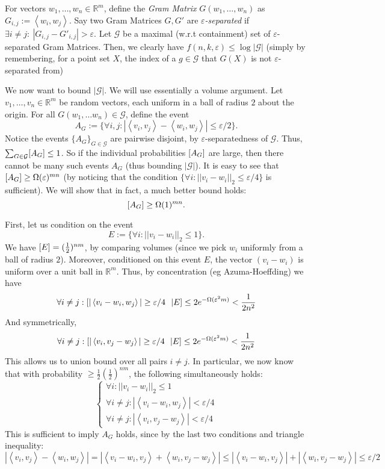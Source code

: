 \documentclass[11pt]{article}
\let\Pr\relax
\DeclareMathOperator*{\Pr}{\mathbb{P}}
\newcommand{\eps}{\varepsilon}
\newcommand{\innp}[1]{\left\langle #1 \right\rangle}
\newcommand{\R}{\mathbb{R}}
\newcommand{\1}{\mathbbm{1}}
\newcommand{\G}{\mathcal{G}}
\begin{document}
For vectors $w_1, \dots, w_n \in \R^m$, define the \emph{Gram Matrix}
$G(w_1, \dots, w_n)$ as $G_{i, j} := \innp{w_i, w_j}$.
Say two Gram Matrices $G, G'$ are \emph{$\eps$-separated} if
$\exists i \neq j:~ |G_{i, j} - G'_{i, j}| > \eps$.
Let $\G$ be a maximal (w.r.t containment) set of $\eps$-separated Gram Matrices.
Then, we clearly have $f(n, k, \eps) \leq \log |\G|$
(simply by remembering, for a point set $X$,
the index of a $g \in \G$ that $G(X)$ is not $\eps$-separated from)

We now want to bound $|\G|$.
We will use essentially a volume argument.
Let $v_1, \dots, v_n \in \R^m$ be random vectors, each uniform in a ball of
radius $2$ about the origin.
For all $G(w_1, \dots w_n) \in \G$, define the event
$$A_G := \{ \forall i, j: |\innp{v_i, v_j} - \innp{w_i, w_j}| \leq \eps/2\}.$$
Notice the events $\{A_G\}_{G \in \G}$ are pairwise disjoint, by
$\eps$-separatedness of $\G$.
Thus, $\sum_{G \in \G} \Pr[A_G] \leq 1$.
So if the individual probabilities $\Pr[A_G]$ are large, then there cannot be
many such events $A_G$ (thus bounding $|\G|$).
It is easy to see
that $\Pr[A_G] \geq \Omega(\eps)^{mn}$
(by noticing that the condition
$\{\forall i: ||v_i - w_i||_2 \leq \eps/4\}$ is sufficient).
We will show that in fact, a much better bound holds:
$$\Pr[A_G] \geq \Omega(1)^{mn}.$$

First, let us condition on the event
$$E := \{\forall i: ||v_i - w_i||_2 \leq 1\}.$$
We have $\Pr[E] = (\frac{1}{2})^{nm}$, by comparing volumes (since we pick $w_i$
uniformly from a ball of radius $2$).
Moreover, conditioned on this event $E$, the vector $(v_i - w_i)$ is uniform
over a unit ball in $\R^m$. Thus, by concentration (eg Azuma-Hoeffding) we have
$$\forall i \neq j: \Pr[|\innp{v_i - w_i, w_j}| \geq \eps/4 ~~| E] \leq 2 e^{-\Omega(\eps^2 m)} < \frac{1}{2n^2}$$
And symmetrically,
$$\forall i \neq j: \Pr[|\innp{v_i, v_j - w_j}| \geq \eps/4 ~~| E] \leq 2 e^{-\Omega(\eps^2 m)} < \frac{1}{2n^2}$$
This allows us to union bound over all pairs $i \neq j$.
In particular, we now know that with probability $\geq \frac{1}{2}
(\frac{1}{2})^{nm}$, the following simultaneously holds:
$$
\begin{cases}
\forall i: ||v_i - w_i||_2 \leq 1\\
\forall i \neq j: |\innp{v_i - w_i, w_j}| < \eps/4\\
\forall i \neq j: |\innp{v_i, v_j - w_j}| < \eps/4
\end{cases}
$$
This is sufficient to imply $A_G$ holds, since by the last two conditions and
triangle inequality:
$$
|\innp{v_i, v_j} - \innp{w_i, w_j}|
=
|\innp{v_i - w_i, v_j} + \innp{w_i, v_j- w_j}|
\leq
|\innp{v_i - w_i, v_j}| + |\innp{w_i, v_j- w_j}|
\leq \eps/2
$$
\end{document}
